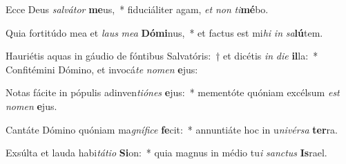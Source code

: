\item Ecce Deus \textit{sal}\textit{vá}\textit{tor} \textbf{me}us,~* fiduciáliter agam, \textit{et} \textit{non} \textit{ti}\textbf{mé}bo.
\item Quia fortitúdo mea et \textit{laus} \textit{me}\textit{a} \textbf{Dó}\textbf{mi}nus,~* et factus est mi\textit{hi} \textit{in} \textit{sa}\textbf{lú}tem.
\item Hauriétis aquas in gáudio de fóntibus Salvatóris:~† et dicétis \textit{in} \textit{di}\textit{e} \textbf{il}la:~* Confitémini Dómino, et invocá\textit{te} \textit{no}\textit{men} \textbf{e}jus:
\item Notas fácite in pópulis adinven\textit{ti}\textit{ó}\textit{nes} \textbf{e}jus:~* mementóte quóniam excélsum \textit{est} \textit{no}\textit{men} \textbf{e}jus.
\item Cantáte Dómino quóniam ma\textit{gní}\textit{fi}\textit{ce} \textbf{fe}cit:~* annuntiáte hoc in u\textit{ni}\textit{vér}\textit{sa} \textbf{ter}ra.
\item Exsúlta et lauda habi\textit{tá}\textit{ti}\textit{o} \textbf{Si}on:~* quia magnus in médio tu\textit{i} \textit{sanc}\textit{tus} \textbf{Is}rael.
